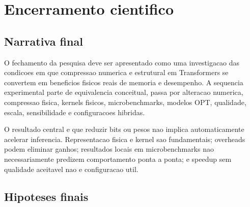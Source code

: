 \chapter{Encerramento cientifico}

\section{Narrativa final}

O fechamento da pesquisa deve ser apresentado como uma investigacao das
condicoes em que compressao numerica e estrutural em Transformers se convertem
em beneficios fisicos reais de memoria e desempenho. A sequencia experimental
parte de equivalencia conceitual, passa por alteracao numerica, compressao
fisica, kernels fisicos, microbenchmarks, modelos OPT, qualidade, escala,
sensibilidade e configuracoes hibridas.

O resultado central e que reduzir bits ou pesos nao implica automaticamente
acelerar inferencia. Representacao fisica e kernel sao fundamentais; overheads
podem eliminar ganhos; resultados locais em microbenchmarks nao necessariamente
predizem comportamento ponta a ponta; e speedup sem qualidade aceitavel nao e
configuracao util.

\section{Hipoteses finais}

